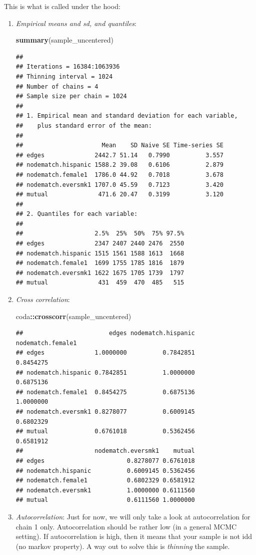 \documentclass[]{book}
\newenvironment{Shaded}{\begin{snugshade}}{\end{snugshade}}
\newcommand{\KeywordTok}[1]{\textcolor[rgb]{0.13,0.29,0.53}{\textbf{#1}}}
\newcommand{\OperatorTok}[1]{\textcolor[rgb]{0.81,0.36,0.00}{\textbf{#1}}}
\newcommand{\NormalTok}[1]{#1}
\theoremstyle{definition}
\theoremstyle{definition}
\theoremstyle{definition}
\theoremstyle{remark}
\begin{document}
This is what is called under the hood:

\begin{enumerate}
\def\labelenumi{\arabic{enumi}.}
\item
  \emph{Empirical means and sd, and quantiles}:

\begin{Shaded}
\begin{Highlighting}[]
\KeywordTok{summary}\NormalTok{(sample_uncentered)}
\end{Highlighting}
\end{Shaded}

\begin{verbatim}
## 
## Iterations = 16384:1063936
## Thinning interval = 1024 
## Number of chains = 4 
## Sample size per chain = 1024 
## 
## 1. Empirical mean and standard deviation for each variable,
##    plus standard error of the mean:
## 
##                      Mean    SD Naive SE Time-series SE
## edges              2442.7 51.14   0.7990          3.557
## nodematch.hispanic 1588.2 39.08   0.6106          2.879
## nodematch.female1  1786.0 44.92   0.7018          3.678
## nodematch.eversmk1 1707.0 45.59   0.7123          3.420
## mutual              471.6 20.47   0.3199          3.120
## 
## 2. Quantiles for each variable:
## 
##                    2.5%  25%  50%  75% 97.5%
## edges              2347 2407 2440 2476  2550
## nodematch.hispanic 1515 1561 1588 1613  1668
## nodematch.female1  1699 1755 1785 1816  1879
## nodematch.eversmk1 1622 1675 1705 1739  1797
## mutual              431  459  470  485   515
\end{verbatim}
\item
  \emph{Cross correlation}:

\begin{Shaded}
\begin{Highlighting}[]
\NormalTok{coda}\OperatorTok{::}\KeywordTok{crosscorr}\NormalTok{(sample_uncentered)}
\end{Highlighting}
\end{Shaded}

\begin{verbatim}
##                        edges nodematch.hispanic nodematch.female1
## edges              1.0000000          0.7842851         0.8454275
## nodematch.hispanic 0.7842851          1.0000000         0.6875136
## nodematch.female1  0.8454275          0.6875136         1.0000000
## nodematch.eversmk1 0.8278077          0.6009145         0.6802329
## mutual             0.6761018          0.5362456         0.6581912
##                    nodematch.eversmk1    mutual
## edges                       0.8278077 0.6761018
## nodematch.hispanic          0.6009145 0.5362456
## nodematch.female1           0.6802329 0.6581912
## nodematch.eversmk1          1.0000000 0.6111560
## mutual                      0.6111560 1.0000000
\end{verbatim}
\item
  \emph{Autocorrelation}: Just for now, we will only take a look at
  autocorrelation for chain 1 only. Autocorrelation should be rather low
  (in a general MCMC setting). If autocorrelation is high, then it means
  that your sample is not idd (no markov property). A way out to solve
  this is \emph{thinning} the sample.


\end{enumerate}
\end{document}
